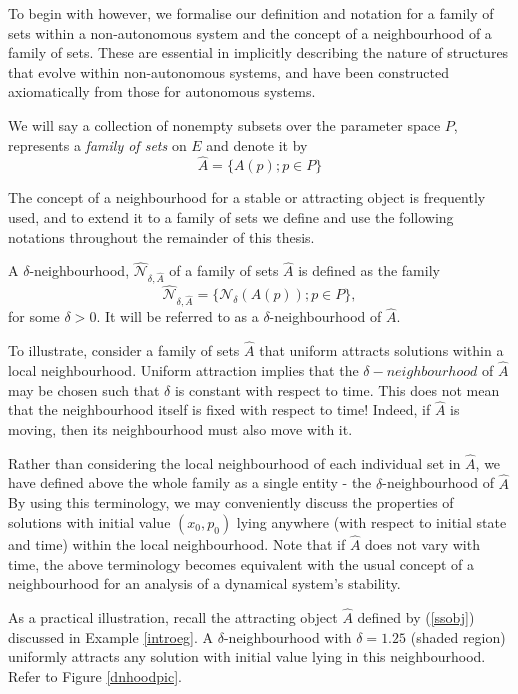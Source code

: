 To begin with however, we formalise our definition and notation for a
family of sets within a non-autonomous system and the concept of a
neighbourhood of a family of sets. These are essential in implicitly
describing the nature of structures that evolve within non-autonomous
systems, and have been constructed axiomatically from those for autonomous
systems.

\begin{notn}
  We will say a collection of nonempty subsets over the parameter
  space $P$, represents a {\em family of sets} on $E$ and denote it by
  \[  \hat{A} = \{ A(p) ; p \in P \} \]
\end{notn}

The concept of a neighbourhood for a stable or attracting object is
frequently used, and to extend it to a family of sets we define and
use the following notations throughout the remainder of this thesis.

\begin{notn}
A $\delta$-neighbourhood, $\hat{\mathcal{N}}_{\delta,\hat{A}}$ of a family
of sets $\hat{A}$ is defined as the family
\[\hat{\mathcal{N}}_{\delta,\hat{A}} = \{ \mathcal{N}_{\delta}(A(p)) ; p
                \in P \}, \]
for some $\delta > 0$. It will be referred to as a $\delta$-neighbourhood
of $\hat{A}$.
\end{notn}

To illustrate, consider a family of sets $\hat{A}$ that uniform attracts solutions within a local neighbourhood. Uniform attraction implies that the $\delta - neighbourhood$ of $\hat{A}$ may be chosen such that $\delta$ is constant with respect to time. This does not mean that the neighbourhood itself is fixed with respect to time! Indeed, if $\hat{A}$ is moving, then its neighbourhood must also move with it.

Rather than considering the local neighbourhood of each individual set in $\hat{A}$, we have defined above the whole family as a single entity - the $\delta$-neighbourhood of $\hat{A}$ By using this terminology, we may conveniently discuss the properties of solutions with initial value $(x_0, p_0)$ lying anywhere (with respect to initial state and time) within the local neighbourhood. Note that if $\hat{A}$ does not vary with time, the above terminology becomes equivalent with the usual concept of a neighbourhood for an analysis of a dynamical system's stability.

As a practical illustration, recall the attracting object $\hat{A}$
defined by (\ref{ssobj}) discussed in Example \ref{introeg}. A $\delta$-neighbourhood with $\delta = 1.25$ (shaded region) uniformly attracts any solution with initial value lying in this neighbourhood. Refer to Figure \ref{dnhoodpic}.

